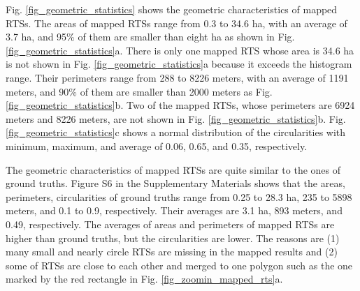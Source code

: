 \documentclass[preprint,12pt,authoryear]{elsarticle}
\begin{document}
Fig. \ref{fig_geometric_statistics} shows the geometric characteristics of mapped RTSs.  The areas of mapped RTSs range from 0.3 to 34.6 ha, with an average of 3.7 ha, and 95\% of them are smaller than eight ha as shown in Fig. \ref{fig_geometric_statistics}a. There is only one mapped RTS whose area is 34.6 ha is not shown in Fig. \ref{fig_geometric_statistics}a because it exceeds the histogram range. Their perimeters range from 288 to 8226 meters, with an average of 1191 meters, and 90\% of them are smaller than 2000 meters as Fig. \ref{fig_geometric_statistics}b. Two of the mapped RTSs, whose perimeters are 6924 meters and 8226 meters, are not shown in Fig. \ref{fig_geometric_statistics}b. Fig. \ref{fig_geometric_statistics}c shows a normal distribution of the circularities with minimum, maximum, and average of 0.06, 0.65, and 0.35, respectively. 

The geometric characteristics of mapped RTSs are quite similar to the ones of ground truths. Figure S6 in the Supplementary Materials shows that the areas, perimeters, circularities of ground truths range from 0.25 to 28.3 ha, 235 to 5898 meters, and 0.1 to 0.9, respectively. Their averages are 3.1 ha, 893 meters, and 0.49, respectively. The averages of areas and perimeters of mapped RTSs are higher than ground truths, but the circularities are lower. The reasons are (1) many small and nearly circle RTSs are missing in the mapped results and (2) some of RTSs are close to each other and merged to one polygon such as the one marked by the red rectangle in Fig. \ref{fig_zoomin_mapped_rts}a.  
\end{document}
